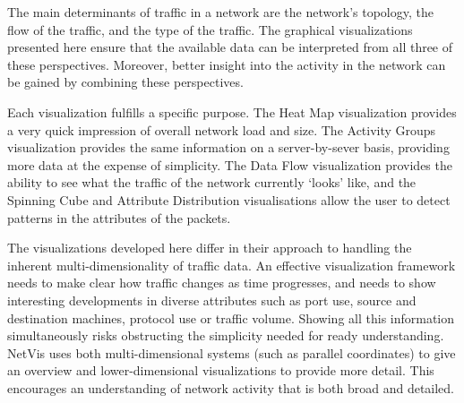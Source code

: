 The main determinants of traffic in a network are the network's topology, the flow of the traffic, and the type of the traffic. The graphical visualizations presented here ensure that the available data can be interpreted from all three of these perspectives. Moreover, better insight into the activity in the network can be gained by combining these perspectives.

Each visualization fulfills a specific purpose.  The Heat Map visualization provides a very quick impression of overall network load and size.  The Activity Groups visualization provides the same information on a server-by-sever basis, providing more data at the expense of simplicity.  The Data Flow visualization provides the ability to see what the traffic of the network currently `looks' like, and the Spinning Cube and Attribute Distribution visualisations allow the user to detect patterns in the attributes of the packets.

The visualizations developed here differ in their approach to handling the inherent multi-dimensionality of traffic data. An effective visualization framework needs to make clear how traffic changes as time progresses, and needs to show interesting developments in diverse attributes such as port use, source and destination machines, protocol use or traffic volume. Showing all this information simultaneously risks obstructing the simplicity needed for ready understanding. NetVis uses both multi-dimensional systems (such as parallel coordinates) to give an overview and lower-dimensional visualizations to provide more detail. This encourages an understanding of network activity that is both broad and detailed.

